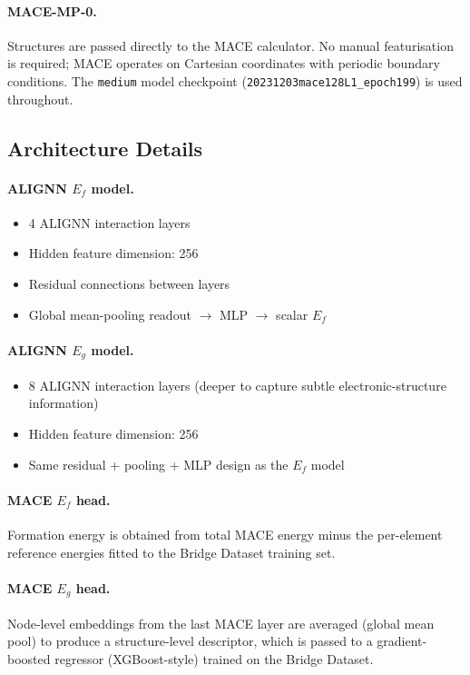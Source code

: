 \documentclass[10pt, a4paper]{article}
\begin{document}
\paragraph{MACE-MP-0.}
Structures are passed directly to the MACE calculator.
No manual featurisation is required; MACE operates on Cartesian
coordinates with periodic boundary conditions.
The \texttt{medium} model checkpoint
(\texttt{20231203mace128L1\_epoch199}) is used throughout.

\subsection{Architecture Details}

\paragraph{ALIGNN $E_f$ model.}
\begin{itemize}[nosep]
  \item 4 ALIGNN interaction layers
  \item Hidden feature dimension: 256
  \item Residual connections between layers
  \item Global mean-pooling readout $\to$ MLP $\to$ scalar $E_f$
\end{itemize}

\paragraph{ALIGNN $E_g$ model.}
\begin{itemize}[nosep]
  \item 8 ALIGNN interaction layers (deeper to capture subtle
    electronic-structure information)
  \item Hidden feature dimension: 256
  \item Same residual + pooling + MLP design as the $E_f$ model
\end{itemize}

\paragraph{MACE $E_f$ head.}
Formation energy is obtained from total MACE energy minus the
per-element reference energies fitted to the Bridge Dataset training
set.

\paragraph{MACE $E_g$ head.}
Node-level embeddings from the last MACE layer are averaged
(global mean pool) to produce a structure-level descriptor, which is
passed to a gradient-boosted regressor (XGBoost-style) trained on
the Bridge Dataset.
\end{document}
